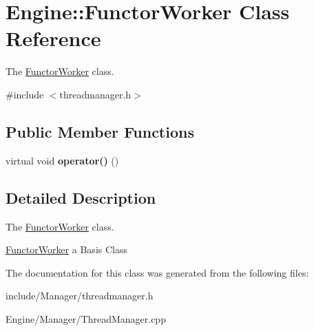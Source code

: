 \hypertarget{classEngine_1_1FunctorWorker}{}\section{Engine\+:\+:Functor\+Worker Class Reference}
\label{classEngine_1_1FunctorWorker}


The \hyperlink{classEngine_1_1FunctorWorker}{Functor\+Worker} class.  




{\ttfamily \#include $<$threadmanager.\+h$>$}

\subsection*{Public Member Functions}
\begin{DoxyCompactItemize}
\item 
\hypertarget{classEngine_1_1FunctorWorker_afdf2e47da4345ac76e9d3591d5579dc2}{}virtual void {\bfseries operator()} ()\label{classEngine_1_1FunctorWorker_afdf2e47da4345ac76e9d3591d5579dc2}

\end{DoxyCompactItemize}


\subsection{Detailed Description}
The \hyperlink{classEngine_1_1FunctorWorker}{Functor\+Worker} class. 

\hyperlink{classEngine_1_1FunctorWorker}{Functor\+Worker} a Basis Class 

The documentation for this class was generated from the following files\+:\begin{DoxyCompactItemize}
\item 
include/\+Manager/threadmanager.\+h\item 
Engine/\+Manager/Thread\+Manager.\+cpp\end{DoxyCompactItemize}
